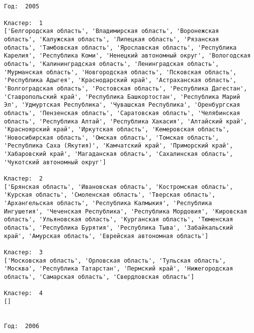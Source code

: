 \documentclass[11pt]{article}
\begin{document}
    \begin{Verbatim}[commandchars=\\\{\}]


Год:  2005

Кластер:  1
['Белгородская область', 'Владимирская область', 'Воронежская область', 'Калужская область', 'Липецкая область', 'Рязанская область', 'Тамбовская область', 'Ярославская область', 'Республика Карелия', 'Республика Коми', 'Ненецкий автономный округ', 'Вологодская область', 'Калинингpадская область', 'Ленинградская область', 'Мурманская область', 'Новгородская область', 'Псковская область', 'Республика Адыгея', 'Краснодарский край', 'Астраханская область', 'Волгоградская область', 'Ростовская область', 'Республика Дагестан', 'Ставропольский край', 'Республика Башкортостан', 'Республика Марий Эл', 'Удмуртская Республика', 'Чувашская Республика', 'Оренбургская область', 'Пензенская область', 'Саратовская область', 'Челябинская область', 'Республика Алтай', 'Республика Хакасия', 'Алтайский край', 'Красноярский край', 'Иркутская область', 'Кемеровская область', 'Новосибирская область', 'Омская область', 'Томская область', 'Республика Саха (Якутия)', 'Камчатский край', 'Приморский край', 'Хабаровский край', 'Магаданская область', 'Сахалинская область', 'Чукотский автономный округ']

Кластер:  2
['Брянская область', 'Ивановская область', 'Костромская область', 'Курская область', 'Смоленская область', 'Тверская область', 'Архангельская область', 'Республика Калмыкия', 'Республика Ингушетия', 'Чеченская Республика', 'Республика Мордовия', 'Кировская область', 'Ульяновская область', 'Курганская область', 'Тюменская область', 'Республика Бурятия', 'Республика Тыва', 'Забайкальский край', 'Амурская область', 'Еврейская автономная область']

Кластер:  3
['Московская область', 'Орловская область', 'Тульская область', 'Москва', 'Республика Татарстан', 'Пермский край', 'Нижегородская область', 'Самарская область', 'Свердловская область']

Кластер:  4
[]


Год:  2006


\end{Verbatim}
\end{document}
